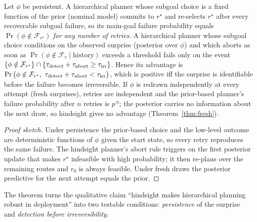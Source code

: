 \begin{theorem}\label{thm:hier}
Let $\phi$ be persistent. A hierarchical planner whose subgoal choice is a fixed function of the prior (nominal model)
commits to $r^\star$ and re-selects $r^\star$ after every recoverable subgoal failure, so its main-goal failure
probability equals $\Pr(\phi\notin\mathcal F_{r^\star})$ \emph{for any number of retries}. A hierarchical planner whose
subgoal choice conditions on the observed surprise (posterior over $\phi$) and which aborts as soon as
$\Pr(\phi\notin\mathcal F_{r}\mid\text{history})$ exceeds a threshold fails only on the event
$\{\phi\notin\mathcal F_{r^\star}\}\cap\{\tau_{\rm detect}+\tau_{\rm abort}\ge\tau_{\rm irr}\}$.
Hence its advantage is $\Pr\big(\phi\notin\mathcal F_{r^\star},\ \tau_{\rm detect}+\tau_{\rm abort}<\tau_{\rm irr}\big)$,
which is positive iff the surprise is identifiable before the failure becomes irreversible.
If $\phi$ is redrawn independently at every attempt (fresh surprises), retries are independent and the
prior-based planner's failure probability after $n$ retries is $p^{\,n}$; the posterior carries no information about the
next draw, so hindsight gives no advantage (Theorem~\ref{thm:fresh}).
\end{theorem}
\begin{proof}[Proof sketch]
Under persistence the prior-based choice and the low-level outcome are deterministic functions of $\phi$ given the
start state, so every retry reproduces the same failure. The hindsight planner's abort rule triggers on the first
posterior update that makes $r^\star$ infeasible with high probability; it then re-plans over the remaining routes
and $r_0$ is always feasible. Under fresh draws the posterior predictive for the next attempt equals the prior.
\end{proof}
The theorem turns the qualitative claim ``hindsight makes hierarchical planning robust in deployment'' into two
testable conditions: \emph{persistence} of the surprise and \emph{detection before irreversibility}.
